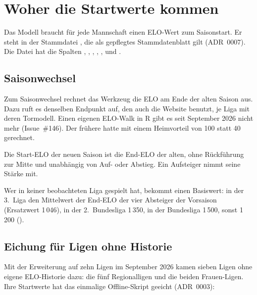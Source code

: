 \chapter{Woher die Startwerte kommen}\label{kap:startwerte}

Das Modell braucht für jede Mannschaft einen ELO-Wert zum Saisonstart. Er
steht in der Stammdatei , die als
gepflegtes Stammdatenblatt gilt (ADR~0007). Die Datei hat die Spalten
, , , ,
,  und .

\section{Saisonwechsel}

Zum Saisonwechsel rechnet das Werkzeug
 die ELO am Ende der alten Saison aus.
Dazu ruft es denselben Endpunkt  auf, den auch die
Website benutzt, je Liga mit deren Tormodell. Einen eigenen ELO-Walk in R
gibt es seit September 2026 nicht mehr (Issue~\#146). Der frühere hatte mit
einem Heimvorteil von 100 statt 40 gerechnet.

\begin{description}[font=\sffamily\bfseries\small]
  \item[Übertrag 1:1] Die Start-ELO der neuen Saison ist die End-ELO der
        alten, ohne Rückführung zur Mitte und unabhängig von Auf- oder
        Abstieg. Ein Aufsteiger nimmt seine Stärke mit.
  \item[Neue Mannschaften] Wer in keiner beobachteten Liga gespielt hat,
        bekommt einen Basiswert: in der 3.~Liga den Mittelwert der End-ELO der
        vier Absteiger der Vorsaison (Ersatzwert 1\,046), in der
        2.~Bundesliga 1\,350, in der Bundesliga 1\,500, sonst 1\,200
        ().
\end{description}

\section{Eichung für Ligen ohne Historie}\label{sec:eichung}

Mit der Erweiterung auf zehn Ligen im September 2026 kamen sieben Ligen ohne
eigene ELO-Historie dazu: die fünf Regionalligen und die beiden
Frauen-Ligen. Ihre Startwerte hat das einmalige Offline-Skript
 geeicht (ADR~0003):

